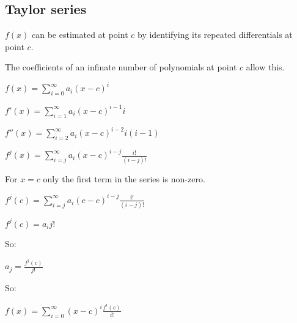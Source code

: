 
\subsection{Taylor series}


\(f(x)\) can be estimated at point \(c\) by identifying its repeated differentials at point \(c\).

The coefficients of an infinate number of polynomials at point \(c\) allow this.

\(f(x)=\sum_{i=0}^{\infty }a_i(x-c)^i\)

\(f'(x)=\sum_{i=1}^{\infty }a_i(x-c)^{i-1}i\)

\(f''(x)=\sum_{i=2}^{\infty }a_i(x-c)^{i-2}i(i-1)\)

\(f^j(x)=\sum_{i=j}^{\infty }a_i(x-c)^{i-j}\frac{i!}{(i-j)!}\)

For \(x=c\) only the first term in the series is non-zero.

\(f^j(c)=\sum_{i=j}^{\infty }a_i(c-c)^{i-j}\frac{i!}{(i-j)!}\)

\(f^j(c)=a_ij!\)

So:

\(a_j=\frac{f^j(c)}{j!}\)

So:

\(f(x)=\sum_{i=0}^\infty (x-c)^i \frac{f^i(c)}{i!}\)

